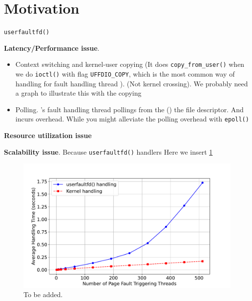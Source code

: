 \section{Motivation}
\label{sec:motivation}

\texttt{userfaultfd()}




\textbf{Latency/Performance issue}. 

\begin{itemize}
    \item Context switching and kernel-user copying (It does \texttt{copy\_from\_user()} when we do \texttt{ioctl()} with flag \texttt{UFFDIO\_COPY}, which is the most common way of handling for fault handling thread                                                                                                                                                ). (Not kernel crossing). We probably need a graph to illustrate this with the copying
    \item Polling. \uffd's fault handling thread pollings from the () the file descriptor. And incurs overhead. While you might alleviate the polling overhead with \texttt{epoll()}
\end{itemize}

\textbf{Resource utilization issue}


\textbf{Scalability issue}. Because \texttt{userfaultfd()} handlers Here we insert \ref{fig:motivation-scalability}



\begin{figure}
        \centering
        \includegraphics[clip,scale=0.33]{figures/motivation_scalability.pdf}
        \caption{To be added.}
        \label{fig:motivation-scalability} 
\end{figure}



